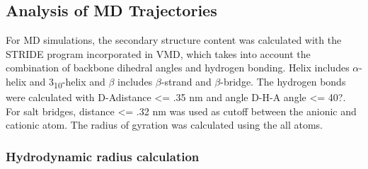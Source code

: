 \documentclass[journal=jacsat,manuscript=article]{achemso}
\begin{document}
\subsection*{Analysis of MD Trajectories} For MD simulations, the secondary structure content was  calculated with the STRIDE program incorporated in VMD,\cite{Humphrey1996}  which takes into account the combination of backbone dihedral angles and hydrogen bonding. Helix includes $\alpha$-helix and 3\textsubscript{10}-helix and $\beta$ includes $\beta$-strand and $\beta$-bridge. The hydrogen bonds were calculated with \textbar  D-A\textbar  distance \textless = .35 nm and angle D-H-A angle \textless= 40?. For salt bridges, distance \textless = .32 nm was used as cutoff between the anionic and cationic atom. The radius of gyration was calculated using the all atoms.

\subsubsection*{Hydrodynamic radius calculation} 




%
%
\end{document}
